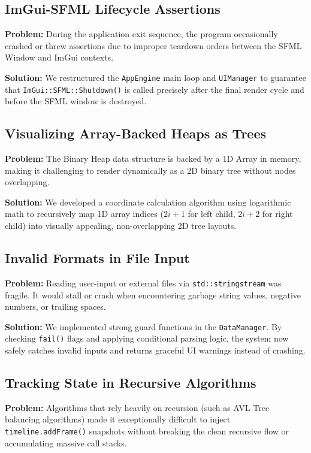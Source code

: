 \subsection{ImGui-SFML Lifecycle Assertions}
\textbf{Problem:} During the application exit sequence, the program occasionally crashed or threw assertions due to improper teardown orders between the SFML Window and ImGui contexts.

\textbf{Solution:} We restructured the \texttt{AppEngine} main loop and \texttt{UIManager} to guarantee that \texttt{ImGui::SFML::Shutdown()} is called precisely after the final render cycle and before the SFML window is destroyed.

\subsection{Visualizing Array-Backed Heaps as Trees}
\textbf{Problem:} The Binary Heap data structure is backed by a 1D Array in memory, making it challenging to render dynamically as a 2D binary tree without nodes overlapping.

\textbf{Solution:} We developed a coordinate calculation algorithm using logarithmic math to recursively map 1D array indices ($2i+1$ for left child, $2i+2$ for right child) into visually appealing, non-overlapping 2D tree layouts.

\subsection{Invalid Formats in File Input}
\textbf{Problem:} Reading user-input or external files via \texttt{std::stringstream} was fragile. It would stall or crash when encountering garbage string values, negative numbers, or trailing spaces.

\textbf{Solution:} We implemented strong guard functions in the \texttt{DataManager}. By checking \texttt{fail()} flags and applying conditional parsing logic, the system now safely catches invalid inputs and returns graceful UI warnings instead of crashing.

\subsection{Tracking State in Recursive Algorithms}
\textbf{Problem:} Algorithms that rely heavily on recursion (such as AVL Tree balancing algorithms) made it exceptionally difficult to inject \texttt{timeline.addFrame()} snapshots without breaking the clean recursive flow or accumulating massive call stacks.

